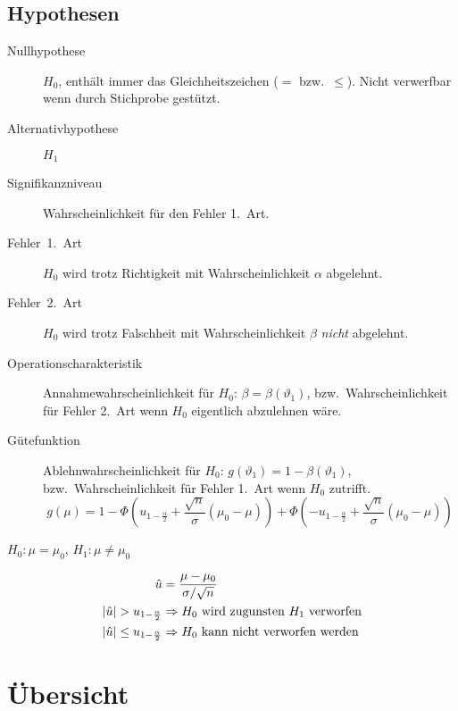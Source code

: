 \section{Hypothesen}
\begin{description}
  \item [{Nullhypothese}] 
	$H_0$, enthält immer das Gleichheitszeichen ($=$ bzw.~$\leq$). Nicht verwerfbar wenn durch Stichprobe gestützt.
  \item [{Alternativhypothese}] 
	$H_1$
  \item [{Signifikanzniveau}] 
	Wahrscheinlichkeit für den Fehler 1.~Art.
  \item [{Fehler~1.~Art}] 
	$H_0$ wird trotz Richtigkeit mit Wahrscheinlichkeit $\alpha$ abgelehnt.
  \item [{Fehler~2.~Art}] 
	$H_0$ wird trotz Falschheit mit Wahrscheinlichkeit $\beta$ \emph{nicht} abgelehnt.
  \item [{Operationscharakteristik}] 
	Annahmewahrscheinlichkeit für $H_0$: $\beta=\beta(\vartheta_{1})$, bzw.~Wahrscheinlichkeit für
	Fehler 2.~Art wenn $H_0$ eigentlich abzulehnen wäre.
  \item [{Gütefunktion}] 
	Ablehnwahrscheinlichkeit für $H_0$: $g(\vartheta_{1})=1-\beta(\vartheta_{1})$, bzw.~Wahrscheinlichkeit für
	Fehler 1.~Art wenn $H_0$ zutrifft.
	\[ g(\mu) = 1-\Phi\left(u_{1-\frac{\alpha}{2}}+\frac{\sqrt{n}}{\sigma}(\mu_{0}-\mu)\right)+\Phi\left(-u_{1-\frac{\alpha}{2}}+\frac{\sqrt{n}}{\sigma}(\mu_{0}-\mu)\right) \]
\end{description}

$H_0:\mu=\mu_0$, $H_1:\mu\neq\mu_0$

\begin{align*}
  \hat{u}                              & =\frac{\mu-\mu_{0}}{\sigma/\sqrt{n}}\\
  \lvert \hat u \rvert > u_{1-\frac{\alpha}{2}}     & \Rightarrow \hbox{$H_0$ wird zugunsten $H_1$ verworfen}\\
  \lvert \hat u \rvert \leq u_{1-\frac{\alpha}{2}} & \Rightarrow \hbox{$H_0$ kann nicht verworfen werden}
\end{align*}



\chapter{Übersicht}

